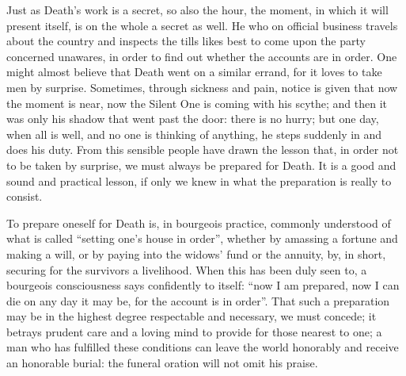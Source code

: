 \documentclass[12pt,a4paper,openany]{book}
\newcommand{\opage}[1]{\marginnote{\footnotesize\textit{[#1]}}}
\begin{document}
Just as Death's work is a secret, so also
the hour, the moment, in which it will present itself,
\setcounter{footnote}{0}%
\opage{194}is on the whole a secret as well. He who on
official business travels about the country and inspects the tills
likes best to come upon the party concerned unawares, in order
to find out whether the accounts are in order. One might
almost believe that Death went on a similar errand, for it
loves to take men by surprise. Sometimes, through
sickness and pain, notice is given that now the moment is
near, now the Silent One is coming with his scythe; and then
it was only his shadow that went past the door: there is
no hurry; but one day, when all is well, and no one
is thinking of anything, he steps suddenly in and does his
duty. From this sensible people have drawn the lesson
that, in order not to be taken by surprise, we must always be prepared
for Death. It is a good and sound and practical
lesson, if only we knew in what the preparation is really to
consist.

To prepare oneself for Death is, in bourgeois practice,
commonly understood of what is called ``setting
one's house in order'', whether by amassing a fortune and making a
will, or by paying into the widows' fund or the annuity,
by, in short, securing for the survivors
a livelihood. When this has been duly seen to, a
bourgeois consciousness says confidently to itself: ``now I am prepared,
now I can die on any day it may be, for the account
is in order''. That such a preparation may be
in the highest degree respectable and necessary, we must concede;
it betrays prudent care and a loving mind to provide
for those nearest to one; a man who has fulfilled these conditions
can leave the world honorably and receive an
honorable burial: the funeral oration will not omit his praise.
\end{document}
